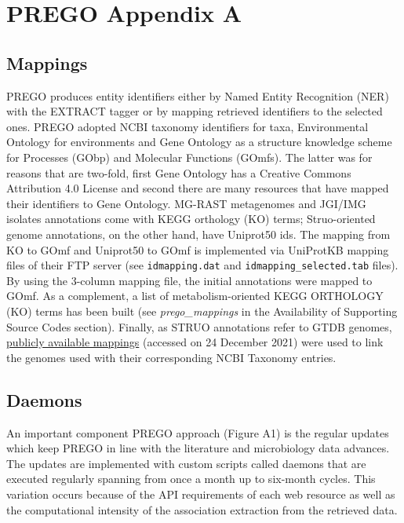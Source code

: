 \chapter{PREGO Appendix A}

\section{Mappings}
\label{app:A}


PREGO produces entity identifiers either by Named Entity Recognition (NER) with the EXTRACT tagger or by mapping retrieved identifiers to the selected ones. 
PREGO adopted NCBI taxonomy identifiers for taxa, Environmental Ontology for environments and Gene Ontology as a structure knowledge scheme for Processes (GObp) and Molecular Functions (GOmfs). 
The latter was for reasons that are two-fold, first Gene Ontology has a Creative Commons Attribution 4.0 License and second there are many resources that have mapped their identifiers to Gene Ontology.
MG-RAST metagenomes and JGI/IMG isolates annotations come with KEGG orthology (KO) terms; 
Struo-oriented genome annotations, on the other hand, have Uniprot50 ids. 
The mapping from KO to GOmf and Uniprot50 to GOmf is implemented via UniProtKB mapping files of their FTP server (see \texttt{idmapping.dat} and \texttt{idmapping\_selected.tab} files). 
By using the 3-column mapping file, the initial annotations were mapped to GOmf. As a complement, a list of metabolism-oriented KEGG ORTHOLOGY (KO) terms has been built (see \textit{prego\_mappings} in the Availability of Supporting Source Codes section).
Finally, as STRUO annotations refer to GTDB genomes, \href{http://ftp.tue.mpg.de/ebio/projects/struo/GTDB_release89/metadata/}{publicly available mappings} (accessed on 24 December 2021) were used to link the genomes used with their corresponding NCBI Taxonomy entries.



\section{Daemons}
\label{app:B}

An important component PREGO approach (Figure A1) is the regular updates which keep PREGO in line with the literature and microbiology data advances. 
The updates are implemented with custom scripts called daemons that are executed regularly spanning from once a month up to six-month cycles. 
This variation occurs because of the API requirements of each web resource as well as the computational intensity of the association extraction from the retrieved data.

